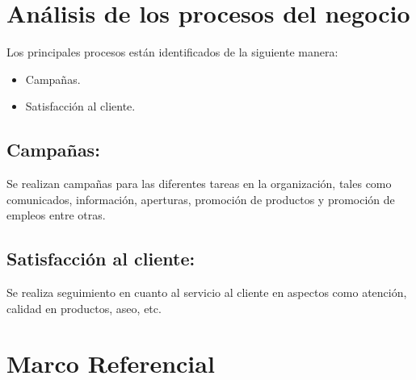 \section{An\'alisis de los procesos del negocio}
Los principales procesos est\'an identificados de la siguiente manera:%
	\begin{itemize}
		\item Campa\~nas.
		\item Satisfacci\'on al cliente.
	\end{itemize}
\subsection{Campa\~nas:}
Se realizan campa\~nas para las diferentes tareas en la organizaci\'on, tales como comunicados, informaci\'on, aperturas, promoci\'on de productos y promoci\'on de empleos entre otras.%
%
\subsection{Satisfacci\'on al cliente:}Se realiza seguimiento en cuanto al servicio al cliente en aspectos como atenci\'on, calidad en productos, aseo, etc.%
%
\section{Marco Referencial}
%
